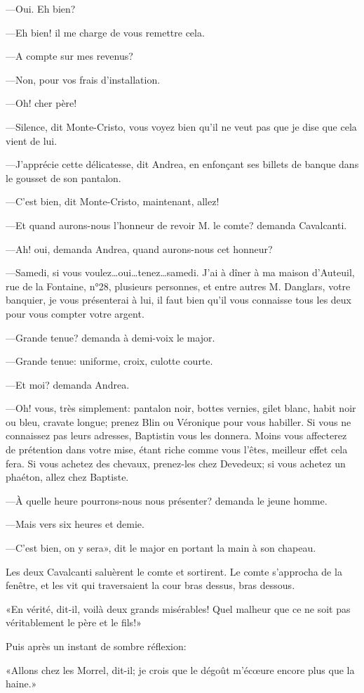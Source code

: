—Oui. Eh bien? 

—Eh bien! il me charge de vous remettre cela. 

—A compte sur mes revenus? 

—Non, pour vos frais d'installation. 

—Oh! cher père! 

—Silence, dit Monte-Cristo, vous voyez bien qu'il ne veut pas que je dise que cela vient de lui. 

—J'apprécie cette délicatesse, dit Andrea, en enfonçant ses billets de banque dans le gousset de son pantalon. 

—C'est bien, dit Monte-Cristo, maintenant, allez! 

—Et quand aurons-nous l'honneur de revoir M. le comte? demanda Cavalcanti. 

—Ah! oui, demanda Andrea, quand aurons-nous cet honneur? 

—Samedi, si vous voulez\dots oui\dots tenez\dots samedi. J'ai à dîner à ma maison d'Auteuil, rue de la Fontaine, n°28, plusieurs personnes, et entre autres M. Danglars, votre banquier, je vous présenterai à lui, il faut bien qu'il vous connaisse tous les deux pour vous compter votre argent. 

—Grande tenue? demanda à demi-voix le major. 

—Grande tenue: uniforme, croix, culotte courte. 

—Et moi? demanda Andrea. 

—Oh! vous, très simplement: pantalon noir, bottes vernies, gilet blanc, habit noir ou bleu, cravate longue; prenez Blin ou Véronique pour vous habiller. Si vous ne connaissez pas leurs adresses, Baptistin vous les donnera. Moins vous affecterez de prétention dans votre mise, étant riche comme vous l'êtes, meilleur effet cela fera. Si vous achetez des chevaux, prenez-les chez Devedeux; si vous achetez un phaéton, allez chez Baptiste. 

—À quelle heure pourrons-nous nous présenter? demanda le jeune homme. 

—Mais vers six heures et demie. 

—C'est bien, on y sera», dit le major en portant la main à son chapeau. 

Les deux Cavalcanti saluèrent le comte et sortirent. Le comte s'approcha de la fenêtre, et les vit qui traversaient la cour bras dessus, bras dessous. 

«En vérité, dit-il, voilà deux grands misérables! Quel malheur que ce ne soit pas véritablement le père et le fils!» 

Puis après un instant de sombre réflexion: 

«Allons chez les Morrel, dit-il; je crois que le dégoût m'écœure encore plus que la haine.» 
